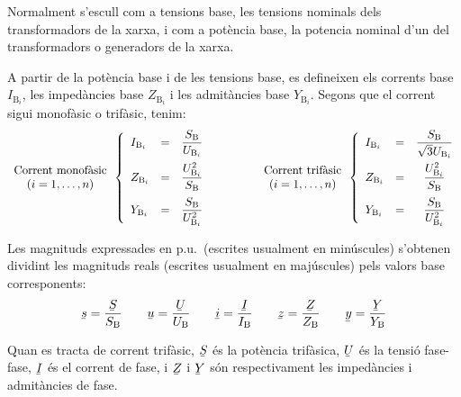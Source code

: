 Normalment s'escull com a tensions base, les tensions nominals dels transformadors de la
xarxa, i com a pot\`{e}ncia base, la potencia nominal d'un del transformadors o generadors de la xarxa.

A partir de la pot\`{e}ncia base i de les tensions base, es
defineixen els corrents base $I_{\text{B}_i}$, les imped\`{a}ncies base $Z_{\text{B}_i}$ i les
admit\`{a}ncies base $Y_{\text{B}_i}$. Segons que el corrent sigui monof\`{a}sic o trif\`{a}sic, tenim:
\begin{equation}
\begin{array}{c} \text{Corrent monof\`{a}sic} \\ (i=1,\ldots,n) \end{array}
\left\{
\begin{array}{lll}
   I_{\text{B}_i} &= &\dfrac{S_\mathrm{B}}{U_{\text{B}_i}} \\[2.5ex]
   Z_{\text{B}_i} &= &\dfrac{U_{\text{B}_i}^2}{S_\mathrm{B}} \\[2.5ex]
   Y_{\text{B}_i} &= &\dfrac{S_\mathrm{B}}{U_{\text{B}_i}^2}
\end{array}
\right.
\qquad\qquad
\begin{array}{c} \text{Corrent trif\`{a}sic} \\ (i=1,\ldots,n) \end{array}
\left\{
\begin{array}{llc}
   I_{\text{B}_i} &= &\dfrac{S_\mathrm{B}}{\sqrt{3} U_{\text{B}_i}} \\[2.5ex]
   Z_{\text{B}_i} &= &\dfrac{U_{\text{B}_i}^2}{S_\mathrm{B}} \\[2.5ex]
   Y_{\text{B}_i} &= &\dfrac{S_\mathrm{B}}{U_{\text{B}_i}^2}
\end{array}
\right.
\end{equation}

Les magnituds expressades en p.u.\ (escrites usualment en min\'{u}scules) s'obtenen
dividint les magnituds reals (escrites usualment en maj\'{u}scules) pels valors base corresponents:
\begin{equation}
   \cmplx{s} = \frac{\cmplx{S}}{S\ped{B}} \qquad \cmplx{u} = \frac{\cmplx{U}}{U\ped{B}} \qquad \cmplx{i} = \frac{\cmplx{I}}{I\ped{B}} \qquad \cmplx{z} = \frac{\cmplx{Z}}{Z\ped{B}} \qquad \cmplx{y} = \frac{\cmplx{Y}}{Y\ped{B}}
\end{equation}

Quan es tracta de corrent trif\`{a}sic, $\cmplx{S}$ \'{e}s la pot\`{e}ncia trif\`{a}sica, $\cmplx{U}$ \'{e}s la tensi\'{o} fase-fase, $\cmplx{I}$ \'{e}s el corrent de fase, i $\cmplx{Z}$ i $\cmplx{Y}$ s\'{o}n respectivament les imped\`{a}ncies i admit\`{a}ncies de fase.

